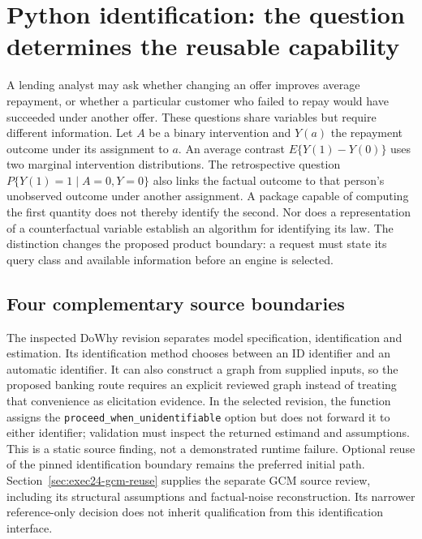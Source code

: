 \section{Python identification: the question determines the reusable capability}
\label{exec18:pyid-question}

A lending analyst may ask whether changing an offer improves average repayment,
or whether a particular customer who failed to repay would have succeeded under
another offer. These questions share variables but require different information.
Let $A$ be a binary intervention and $Y(a)$ the repayment outcome under its
assignment to $a$. An average contrast $E\{Y(1)-Y(0)\}$ uses two marginal
intervention distributions. The retrospective question
$P\{Y(1)=1\mid A=0,Y=0\}$ also links the factual outcome to that person's
unobserved outcome under another assignment. A package capable of computing the
first quantity does not thereby identify the second. Nor does a representation
of a counterfactual variable establish an algorithm for identifying its law.
The distinction changes the proposed product boundary: a request must state its
query class and available information before an engine is selected.
\citep{exec13_y0_dsl,exec18_pyid_contract}

\subsection{Four complementary source boundaries}
\label{exec18:pyid-packages}

The inspected DoWhy revision separates model specification, identification and
estimation. Its identification method chooses between an ID identifier and an
automatic identifier. It can also construct a graph from supplied inputs, so
the proposed banking route requires an explicit reviewed graph instead of
treating that convenience as elicitation evidence. In the selected revision,
the function assigns the \texttt{proceed\_when\_unidentifiable} option but does
not forward it to either identifier; validation must inspect the returned
estimand and assumptions. This is a static source finding, not a demonstrated
runtime failure. Optional reuse of the pinned identification boundary remains
the preferred initial path. Section~\ref{sec:exec24-gcm-reuse} supplies the
separate GCM source review, including its structural assumptions and
factual-noise reconstruction. Its narrower reference-only decision does not
inherit qualification from this identification interface.
\citep{exec13_dowhy}

